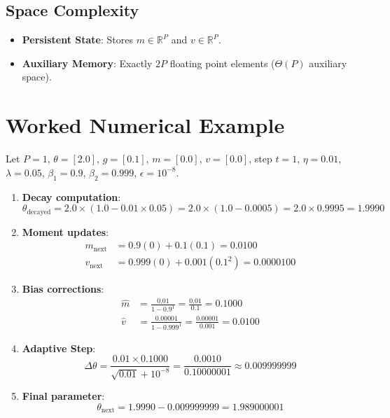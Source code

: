 \documentclass[11pt,a4paper]{article}
\theoremstyle{definition}
\begin{document}
\subsection{Space Complexity}
\begin{itemize}
    \item \textbf{Persistent State}: Stores $m \in \mathbb{R}^P$ and $v \in \mathbb{R}^P$.
    \item \textbf{Auxiliary Memory}: Exactly $2P$ floating point elements ($\Theta(P)$ auxiliary space).
\end{itemize}

\section{Worked Numerical Example}

Let $P=1$, $\theta = [2.0]$, $g = [0.1]$, $m = [0.0]$, $v = [0.0]$, step $t=1$, $\eta = 0.01$, $\lambda = 0.05$, $\beta_1 = 0.9$, $\beta_2 = 0.999$, $\epsilon = 10^{-8}$.

\begin{enumerate}
    \item \textbf{Decay computation}:
    \begin{equation}
    \theta_{\text{decayed}} = 2.0 \times (1.0 - 0.01 \times 0.05) = 2.0 \times (1.0 - 0.0005) = 2.0 \times 0.9995 = 1.9990
    \end{equation}
    \item \textbf{Moment updates}:
    \begin{align}
    m_{\text{next}} &= 0.9(0) + 0.1(0.1) = 0.0100 \\
    v_{\text{next}} &= 0.999(0) + 0.001(0.1^2) = 0.0000100
    \end{align}
    \item \textbf{Bias corrections}:
    \begin{align}
    \hat{m} &= \frac{0.01}{1 - 0.9^1} = \frac{0.01}{0.1} = 0.1000 \\
    \hat{v} &= \frac{0.00001}{1 - 0.999^1} = \frac{0.00001}{0.001} = 0.0100
    \end{align}
    \item \textbf{Adaptive Step}:
    \begin{equation}
    \Delta \theta = \frac{0.01 \times 0.1000}{\sqrt{0.01} + 10^{-8}} = \frac{0.0010}{0.10000001} \approx 0.009999999
    \end{equation}
    \item \textbf{Final parameter}:
    \begin{equation}
    \theta_{\text{next}} = 1.9990 - 0.009999999 = 1.989000001
    \end{equation}
\end{enumerate}
\end{document}
